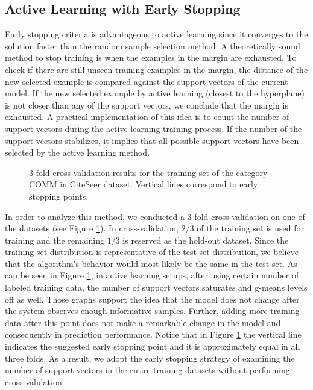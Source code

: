 \subsection{Active Learning with Early Stopping}
\label{ES}
Early stopping criteria is advantageous to active learning since it converges to the solution faster than the random sample selection method. A theoretically sound method to stop training is when the examples in the margin are exhausted. To check if there are still unseen training examples in the margin, the distance of the new selected example is compared against the support vectors of the current model. If the new selected example by active learning (closest to the hyperplane) is not closer than any of the support vectors, we conclude that the margin is exhausted. A practical implementation of this idea is to count the number of support vectors during the active learning training process. If the number of the support vectors stabilizes, it implies that all possible support vectors have been selected by the active learning method.

\begin{figure}[b]
    \hspace{-10mm}
    \caption{3-fold cross-validation results for the training set of the category COMM in CiteSeer dataset. Vertical lines correspond to early stopping points.}
    \label{fig:comm}
\end{figure}

In order to analyze this method, we conducted a 3-fold cross-validation on one of the datasets (see Figure \ref{fig:comm}). In cross-validation, $2/3$ of the training set is used for training and the remaining $1/3$ is reserved as the hold-out dataset. Since the training set distribution is representative of the test set distribution, we believe that the algorithm's behavior would most likely be the same in the test set. As can be seen in Figure \ref{fig:comm}, in active learning setups, after using certain number of labeled training data, the number of support vectors saturates and  g-means levels off as well. Those graphs support the idea that the model does not change after the system observes enough informative samples. Further, adding more training data after this point does not make a remarkable change in the model and consequently in prediction performance. Notice that in Figure \ref{fig:comm} the vertical line indicates the suggested early stopping point and it is approximately equal in all three folds. As a result, we adopt the early stopping strategy of examining the number of support vectors in the entire training datasets without performing cross-validation.

